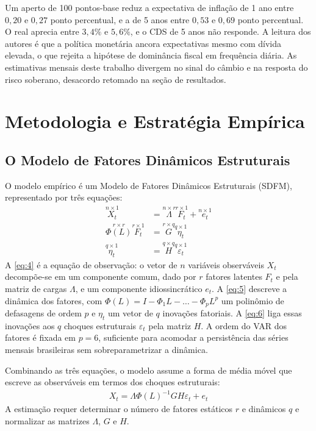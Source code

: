 \documentclass[preprint,authoryear,review,12pt]{elsarticle}
\begin{document}
Um aperto de 100 pontos-base reduz a expectativa de inflação de 1 ano entre $0{,}20$ e $0{,}27$ ponto percentual, e a de 5 anos entre $0{,}53$ e $0{,}69$ ponto percentual. O real aprecia entre $3{,}4\%$ e $5{,}6\%$, e o CDS de 5 anos não responde. A leitura dos autores é que a política monetária ancora expectativas mesmo com dívida elevada, o que rejeita a hipótese de dominância fiscal em frequência diária. As estimativas mensais deste trabalho divergem no sinal do câmbio e na resposta do risco soberano, desacordo retomado na seção de resultados.


\section{Metodologia e Estratégia Empírica}
\label{sec:metodologia}

\subsection{O Modelo de Fatores Dinâmicos Estruturais}

O modelo empírico é um Modelo de Fatores Dinâmicos Estruturais (SDFM), representado por três equações:
\begin{align}
    \overset{n\times 1}{X_t} &= \overset{n\times r}{\Lambda} \overset{r\times 1}{F_t} + \overset{n\times 1}{e_t}\label{eq:4}\\[4pt]
    \overset{r\times r}{\Phi(L)}\overset{r\times 1}{F_t} &= \overset{r\times q}{G} \overset{q\times 1}{\eta_t} \label{eq:5}\\[4pt]
    \overset{q\times 1}{\eta_t} &= \overset{q\times q}{H} \overset{q\times 1}{\varepsilon_t} \label{eq:6}
\end{align}
A \ref{eq:4} é a equação de observação: o vetor de $n$ variáveis observáveis $X_t$ decompõe-se em um componente comum, dado por $r$ fatores latentes $F_t$ e pela matriz de cargas $\Lambda$, e um componente idiossincrático $e_t$. A \ref{eq:5} descreve a dinâmica dos fatores, com $\Phi(L) = I - \Phi_1 L - \dots - \Phi_p L^p$ um polinômio de defasagens de ordem $p$ e $\eta_t$ um vetor de $q$ inovações fatoriais. A \ref{eq:6} liga essas inovações aos $q$ choques estruturais $\varepsilon_t$ pela matriz $H$. A ordem do VAR dos fatores é fixada em $p = 6$, suficiente para acomodar a persistência das séries mensais brasileiras sem sobreparametrizar a dinâmica.

Combinando as três equações, o modelo assume a forma de média móvel que escreve as observáveis em termos dos choques estruturais:
\begin{align}\label{eq:7}
    X_t=\Lambda \Phi(L)^{-1}GH\varepsilon_t + e_t
\end{align}
A estimação requer determinar o número de fatores estáticos $r$ e dinâmicos $q$ e normalizar as matrizes $\Lambda$, $G$ e $H$.
\end{document}

